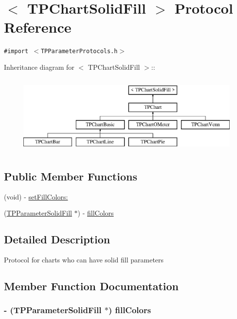 \hypertarget{protocol_t_p_chart_solid_fill-p}{
\section{$<$ TPChartSolidFill $>$ Protocol Reference}
\label{protocol_t_p_chart_solid_fill-p}
}
{\tt \#import $<$TPParameterProtocols.h$>$}

Inheritance diagram for $<$ TPChartSolidFill $>$::\begin{figure}[H]
\begin{center}
\leavevmode
\includegraphics[height=4cm]{protocol_t_p_chart_solid_fill-p}
\end{center}
\end{figure}
\subsection*{Public Member Functions}
\begin{CompactItemize}
\item 
(void) - \hyperlink{protocol_t_p_chart_solid_fill-p_6e76d20ece19c4a545c530ae19cf39c7}{setFillColors:}
\item 
(\hyperlink{interface_t_p_parameter_solid_fill}{TPParameterSolidFill} $\ast$) - \hyperlink{protocol_t_p_chart_solid_fill-p_4691f3015a03c6b4d975e33e7999bdd3}{fillColors}
\end{CompactItemize}


\subsection{Detailed Description}
Protocol for charts who can have solid fill parameters 

\subsection{Member Function Documentation}
\hypertarget{protocol_t_p_chart_solid_fill-p_4691f3015a03c6b4d975e33e7999bdd3}{
\subsubsection[{fillColors}]{\setlength{\rightskip}{0pt plus 5cm}- ({\bf TPParameterSolidFill} $\ast$) fillColors }}
\label{protocol_t_p_chart_solid_fill-p_4691f3015a03c6b4d975e33e7999bdd3}


